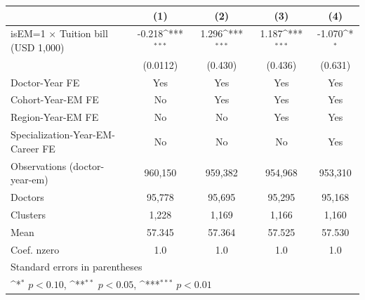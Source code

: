 {
\def\sym#1{\ifmmode^{#1}\else\(^{#1}\)\fi}
\begin{tabular}{l*{4}{c}}
\hline\hline
                    &\multicolumn{1}{c}{(1)}         &\multicolumn{1}{c}{(2)}         &\multicolumn{1}{c}{(3)}         &\multicolumn{1}{c}{(4)}         \\
\hline
isEM=1 $\times$ Tuition bill (USD 1,000)&      -0.218\sym{***}&       1.296\sym{***}&       1.187\sym{***}&      -1.070\sym{*}  \\
                    &    (0.0112)         &     (0.430)         &     (0.436)         &     (0.631)         \\
[1em]
Doctor-Year FE      &         Yes         &         Yes         &         Yes         &         Yes         \\
[1em]
Cohort-Year-EM FE   &          No         &         Yes         &         Yes         &         Yes         \\
[1em]
Region-Year-EM FE   &          No         &          No         &         Yes         &         Yes         \\
[1em]
Specialization-Year-EM-Career FE&          No         &          No         &          No         &         Yes         \\
\hline
Observations (doctor-year-em)&     960,150         &     959,382         &     954,968         &     953,310         \\
Doctors             &      95,778         &      95,695         &      95,295         &      95,168         \\
Clusters            &       1,228         &       1,169         &       1,166         &       1,160         \\
Mean                &      57.345         &      57.364         &      57.525         &      57.530         \\
Coef. %
nzero               &         1.0         &         1.0         &         1.0         &         1.0         \\
\hline\hline
\multicolumn{5}{l}{\footnotesize Standard errors in parentheses}\\
\multicolumn{5}{l}{\footnotesize \sym{*} \(p<0.10\), \sym{**} \(p<0.05\), \sym{***} \(p<0.01\)}\\
\end{tabular}
}
